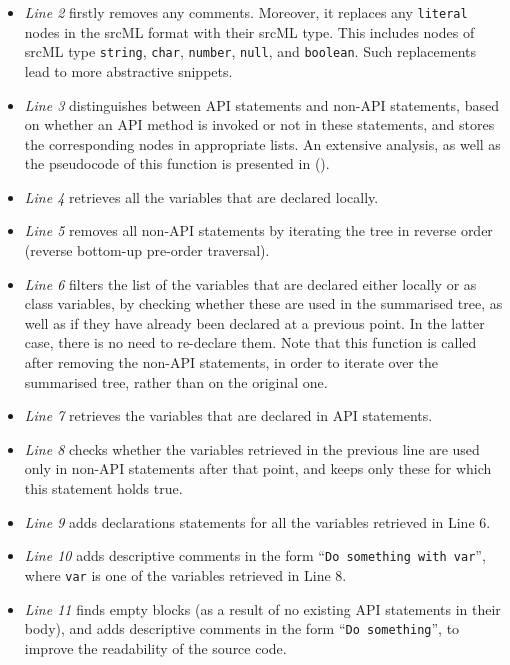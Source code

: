 \begin{itemize}
\item \textit{Line 2} firstly removes any comments. Moreover, it replaces any \texttt{literal} nodes in the srcML format with their srcML type. This includes nodes of srcML type \texttt{string}, \texttt{char}, \texttt{number}, \texttt{null}, and \texttt{boolean}. Such replacements lead to more abstractive snippets.
\item \textit{Line 3} distinguishes between API statements and non-API statements, based on whether an API method is invoked or not in these statements, and stores the corresponding nodes in appropriate lists. An extensive analysis, as well as the pseudocode of this function is presented in  ().
\item \textit{Line 4} retrieves all the variables that are declared locally.
\item \textit{Line 5} removes all non-API statements by iterating the tree in reverse order (reverse bottom-up pre-order traversal).
\item \textit{Line 6} filters the list of the variables that are declared either locally or as class variables, by checking whether these are used in the summarised tree, as well as if they have already been declared at a previous point. In the latter case, there is no need to re-declare them. Note that this function is called after removing the non-API statements, in order to iterate over the summarised tree, rather than on the original one.
\item \textit{Line 7} retrieves the variables that are declared in API statements.
\item \textit{Line 8} checks whether the variables retrieved in the previous line are used only in non-API statements after that point, and keeps only these for which this statement holds true.
\item \textit{Line 9} adds declarations statements for all the variables retrieved in Line 6.
\item \textit{Line 10} adds descriptive comments in the form ``\texttt{Do something with var}'', where \texttt{var} is one of the variables retrieved in Line 8.
\item \textit{Line 11} finds empty blocks (as a result of no existing API statements in their body), and adds descriptive comments in the form ``\texttt{Do something}'', to improve the readability of the source code.
\end{itemize}

